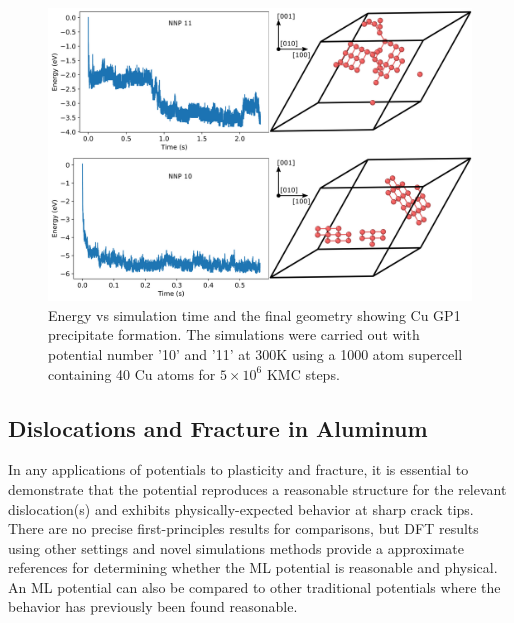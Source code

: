 \documentclass{article}
\begin{document}
\begin{figure}[H]
  \centering
  \includegraphics[width=6.5in]{kmcFigures/gp1.pdf}
  \caption{Energy vs simulation time and the final geometry showing Cu GP1 precipitate formation. The simulations were carried out with potential number '10' and '11' at 300K using a 1000 atom supercell containing 40 Cu atoms for $5\times10^6$ KMC steps.
  }
  \label{fig:gp1}
\end{figure}
%

\subsection{Dislocations and Fracture in Aluminum} \label{sct:fracture_dislocation}

In any applications of potentials to plasticity and fracture, it is essential to demonstrate that the potential reproduces a reasonable structure for the relevant dislocation(s) and exhibits physically-expected behavior at sharp crack tips.  There are no precise first-principles results for comparisons, but DFT results using other settings and novel simulations methods provide a approximate references for determining whether the ML potential is reasonable and physical.  An ML potential can also be compared to other traditional potentials where the behavior has previously been found reasonable.
\end{document}
